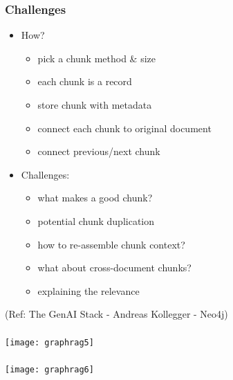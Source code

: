 \begin{frame}[fragile]\frametitle{Challenges}
    \begin{itemize}
        \item How?
		    \begin{itemize}
				\item pick a chunk method \& size
				\item each chunk is a record
				\item store chunk with metadata
				\item connect each chunk to original document
				\item connect previous/next chunk
		    \end{itemize}
        \item Challenges:
		    \begin{itemize}
				\item what makes a good chunk?
				\item potential chunk duplication
				\item how to re-assemble chunk context?
				\item  what about cross-document chunks?
				\item explaining the relevance
		    \end{itemize}
    \end{itemize}
	
	{\tiny (Ref: The GenAI Stack - Andreas Kollegger - Neo4j)}
	
\end{frame}

\begin{frame}[fragile]\frametitle{}

	\begin{center}
	\texttt{[image: graphrag5]}
	\end{center}
	
\end{frame}

\begin{frame}[fragile]\frametitle{}

	\begin{center}
	\texttt{[image: graphrag6]}
	\end{center}
	
\end{frame}

